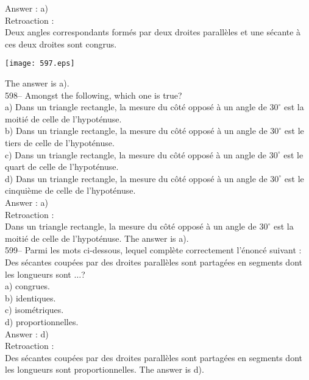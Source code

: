 ﻿\documentclass[letterpaper, 12pt]{article}
\begin{document}
Answer : a)\\

Retroaction : \\
Deux angles correspondants form\'es par deux droites parall\`eles et
une s\'ecante \`a ces deux droites sont congrus.   \begin{center}
    \texttt{[image: 597.eps]}
    \end{center}  The answer is a).\\

598-- Amongst the following, which one is true?\\
a) Dans un triangle rectangle, la mesure du c\^ot\'e oppos\'e \`a un angle
de $30^{\circ}$ est la moiti\'e de celle de l'hypot\'enuse.\\
b) Dans un triangle rectangle, la mesure du c\^ot\'e oppos\'e \`a un angle
de $30^{\circ}$ est le tiers de celle de l'hypot\'enuse. \\
c) Dans un triangle rectangle, la mesure du c\^ot\'e oppos\'e \`a un angle
de $30^{\circ}$ est le quart de celle de l'hypot\'enuse.  \\
d) Dans un triangle rectangle, la mesure du c\^ot\'e oppos\'e \`a un angle
de $30^{\circ}$ est le cinqui\`eme de celle de l'hypot\'enuse.  \\

Answer : a)\\

Retroaction : \\
Dans un triangle rectangle, la mesure du c\^ot\'e oppos\'e \`a un angle de
$30^{\circ}$ est la moiti\'e de celle de l'hypot\'enuse.  The answer is
a).\\

599-- Parmi les mots ci-dessous, lequel compl\`ete correctement
l'\'enonc\'e suivant : \og Des s\'ecantes coup\'ees par des droites
parall\`eles sont partag\'ees en segments dont les longueurs sont $\ldots$\fg?\\
a) congrues.\\
b) identiques.\\
c) isom\'etriques.\\
d) proportionnelles.\\

Answer : d)\\

Retroaction : \\
Des s\'ecantes coup\'ees par des droites parall\`eles sont partag\'ees en
segments dont les longueurs sont proportionnelles.  The answer is d).\\
\end{document}
